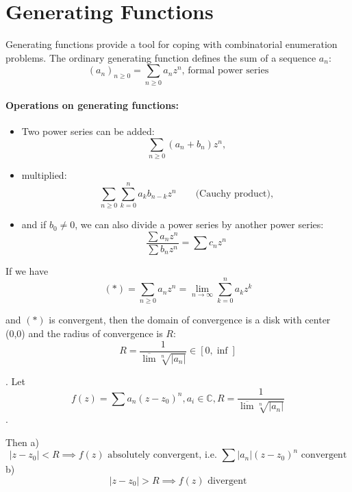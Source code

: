 

\section{Generating Functions}

Generating functions provide a tool for coping with combinatorial enumeration problems. The ordinary generating function defines the sum of a sequence $a_n$:
\[
	(a_n)_{n≥0} = \sum_{n≥0} a_n z^n \text{, formal power series}
\]
\paragraph{Operations on generating functions:}
\begin{itemize}
	\item Two power series can be added:
	\[
		\sum_{n≥0} (a_n + b_n) z^n \text{,}
	\]

	\item multiplied:
	\[
		\sum_{n≥0}\sum_{k=0}^n a_k b_{n-k} z^n \qquad \text{(Cauchy product),}
	\]

	\item and if $b_0 ≠ 0$, we can also divide a power series by another power series:
	\[
	    \frac{
	        \sum a_n z^n
	    }{
	        \sum b_n z^n
	    } =
	        \sum c_n z^n
	\]
\end{itemize}

If we have
\[
    (*) = \sum_{n≥0} a_n z^n = \lim_{n \to ∞} \sum_{k=0}^{n} a_k z^k
\]

and $(*)$ is convergent, then the domain of convergence is a disk with center (0,0) and the radius of convergence is $R$:
\[
    R = \frac1{\overline{\lim} \sqrt[n]{|a_n|}} \in [0, \inf]
\]

\Theorem.
Let
\[
    f(z) = \sum a_n (z-z_0)^n,
    a_i\in \mathbb{C},
    R = \frac{1}{\overline{\lim} \sqrt[n]{|a_n|}}
\].

Then
a)
\[
    |z - z_0| < R \implies
    \text{$f(z)$ absolutely convergent,
    i.e.
    $\sum |a_n| (z-z_0)^n$ convergent}
\]
b)
\[
    |z - z_0| > R \implies \text{$f(z)$ divergent}
\]


